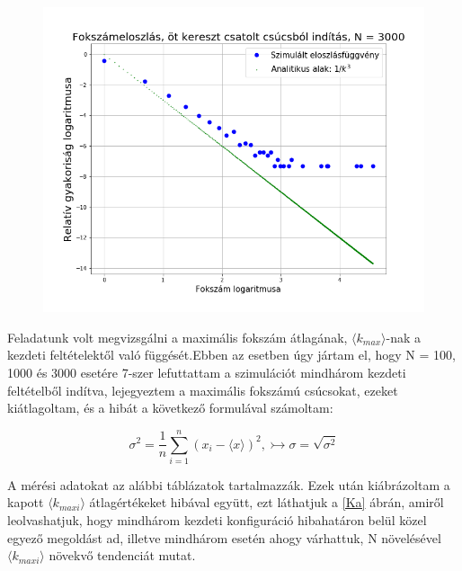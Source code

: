 \documentclass[a4paper, 12pt]{article}
\numberwithin{equation}{section}          %
\numberwithin{figure}{subsection}
\begin{document}
\begin{figure}[c!]
	\begin{center}
		\includegraphics[width=1\textwidth]{harmadik3000log.png}
	\end{center}
\end{figure}
\clearpage



Feladatunk volt megvizsgálni a maximális fokszám átlagának, $\langle k_{max} \rangle$-nak a kezdeti feltételektől való függését.Ebben az esetben úgy jártam el, hogy N = 100, 1000 és 3000 esetére 7-szer lefuttattam a szimulációt mindhárom kezdeti feltételből indítva, lejegyeztem a maximális fokszámú csúcsokat, ezeket kiátlagoltam, és a hibát a következő formulával számoltam:

\begin{center}
	\begin{equation}
	\sigma^2 = \frac{1}{n} \sum_{i = 1}^{n} \left(x_i-\langle x\rangle\right)^2, \rightarrowtail \sigma = \sqrt{\sigma^2}
 	\end{equation}
\end{center}

A mérési adatokat az alábbi táblázatok tartalmazzák. Ezek után kiábrázoltam a kapott $\langle k_{maxi}\rangle$ átlagértékeket hibával együtt, ezt láthatjuk a \ref{Ka} ábrán, amiről leolvashatjuk, hogy mindhárom kezdeti konfiguráció hibahatáron belül közel egyező megoldást ad, illetve mindhárom esetén ahogy várhattuk, N növelésével $\langle k_{maxi}\rangle$ növekvő tendenciát mutat.
\end{document}
